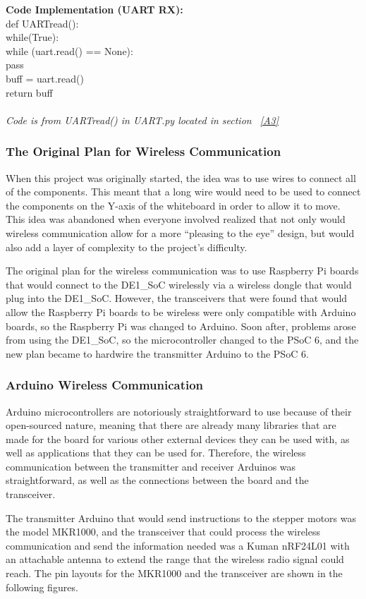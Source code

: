 \noindent \textbf{Code Implementation (UART RX):}\\ 
def UARTread():\\
  while(True):\\
    while (uart.read() == None):\\
      pass\\
    buff = uart.read()\\
    return buff\\\\
\textit{Code is from UARTread() in UART.py located in section  ~\ref{A3}}\\

\subsubsection{The Original Plan for Wireless Communication}

When this project was originally started, the idea was to use wires to connect all of the components. This meant that a long wire would need to be used to connect the components on the Y-axis of the whiteboard in order to allow it to move. This idea was abandoned when everyone involved realized that not only would wireless communication allow for a more “pleasing to the eye” design, but would also add a layer of complexity to the project’s difficulty. \par
\setlength{\parindent}{2.5ex}
The original plan for the wireless communication was to use Raspberry Pi boards that would connect to the DE1\_SoC wirelessly via a wireless dongle that would plug into the DE1\_SoC. However, the transceivers that were found that would allow the Raspberry Pi boards to be wireless were only compatible with Arduino boards, so the Raspberry Pi was changed to Arduino. Soon after, problems arose from using the DE1\_SoC, so the microcontroller changed to the PSoC 6, and the new plan became to hardwire the transmitter Arduino to the PSoC 6. \\

\subsubsection{Arduino Wireless Communication}

Arduino microcontrollers are notoriously straightforward to use because of their open-sourced nature, meaning that there are already many libraries that are made for the board for various other external devices they can be used with, as well as applications that they can be used for. Therefore, the wireless communication between the transmitter and receiver Arduinos was straightforward, as well as the connections between the board and the transceiver. \par
\setlength{\parindent}{2.5ex}
The transmitter Arduino that would send instructions to the stepper motors was the model MKR1000, and the transceiver that could process the wireless communication and send the information needed was a Kuman nRF24L01 with an attachable antenna to extend the range that the wireless radio signal could reach. The pin layouts for the MKR1000 and the transceiver are shown in the following figures.


